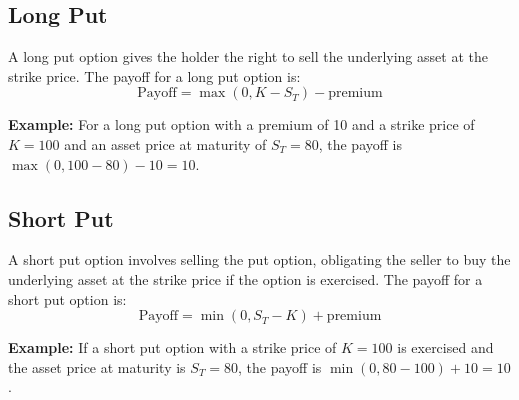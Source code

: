 \subsection*{Long Put}

A long put option gives the holder the right to sell the underlying asset at the strike price. The payoff for a long put option is:
\[ \text{Payoff} = \max(0, K - S_T) - \text{premium}\]

\textbf{Example:} For a long put option with a premium of 10 and a strike price of \( K = 100 \) and an asset price at maturity of \( S_T = 80 \), the payoff is \( \max(0, 100 - 80) -10 = 10 \).

\begin{figure}[H]
    \centering
\end{figure}

\subsection*{Short Put}

A short put option involves selling the put option, obligating the seller to buy the underlying asset at the strike price if the option is exercised. The payoff for a short put option is:
\[ \text{Payoff} = \min(0, S_T - K) + \text{premium} \]

\textbf{Example:} If a short put option with a strike price of \( K = 100 \) is exercised and the asset price at maturity is \( S_T = 80 \), the payoff is \( \min(0, 80 - 100)  + 10= 10\).

\begin{figure}[H]
    \centering
\end{figure}

